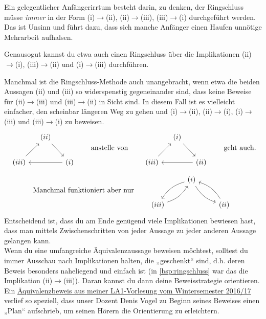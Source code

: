 \begin{bem}
    Ein gelegentlicher Anfängerirrtum besteht darin, zu denken, der Ringschluss müsse \emph{immer} in der Form (i)$\to$(ii), (ii)$\to$(iii), (iii)$\to$(i) durchgeführt werden. Das ist Unsinn und führt dazu, dass sich manche Anfänger einen Haufen unnötige Mehrarbeit aufhalsen.
    
    Genausogut kannst du etwa auch einen Ringschluss über die Implikationen (ii)$\to$(i), (iii)$\to$(ii) und (i)$\to$(iii) durchführen.
    
    Manchmal ist die Ringschluss-Methode auch unangebracht, wenn etwa die beiden Aussagen (ii) und (iii) so widerspenstig gegeneinander sind, dass keine Beweise für (ii)$\to$(iii) und (iii)$\to$(ii) in Sicht sind. In diesem Fall ist es vielleicht einfacher, den scheinbar längeren Weg zu gehen und (i)$\to$(ii), (ii)$\to$(i), (i)$\to$(iii) und (iii)$\to$(i) zu beweisen.
    \[\begin{tikzcd}[column sep=small]
        & (ii) \ar[rd] & \\
        (iii)\ar[ru] && (i)\ar[ll]
    \end{tikzcd}\qquad\text{anstelle von}\qquad\begin{tikzcd}[column sep=small]
        & (i) \ar[rd] & \\
        (iii)\ar[ru] && (ii)\ar[ll]    
    \end{tikzcd}\qquad\text{geht auch.}\]
    \[\text{Manchmal funktioniert aber nur}\qquad \begin{tikzcd}
        & (i) \ar[ld, bend right=20]  \ar[rd, bend right=20] & \\
        (iii)\ar[ru, bend right=20] && (ii) \ar[lu, bend right=20]
    \end{tikzcd}\]
    Entscheidend ist, dass du am Ende genügend viele Implikationen bewiesen hast, dass man mittels Zwischenschritten von jeder Aussage zu jeder anderen Aussage gelangen kann. \\[0.5em]
    Wenn du eine umfangreiche Äquivalenzaussage beweisen möchtest, solltest du immer Ausschau nach Implikationen halten, die „geschenkt“ sind, d.h. deren Beweis besonders naheliegend und einfach ist (in \cref{bsp:ringschluss} war das die Implikation (ii)$\to$(iii)). Daran kannst du dann deine Beweisstrategie orientieren. Ein \href{https://mampf.mathi.uni-heidelberg.de/media/105/play?time=2609}{Äquivalenzbeweis aus meiner LA1-Vorlesung vom Wintersemester 2016/17} verlief so speziell, dass unser Dozent Denis Vogel zu Beginn seines Beweises einen „Plan“ aufschrieb, um seinen Hörern die Orientierung zu erleichtern.

\end{bem}
